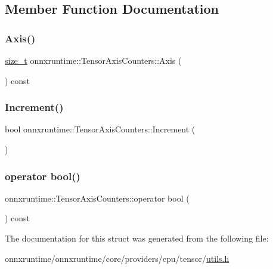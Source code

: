 \subsection{Member Function Documentation}
\mbox{\label{structonnxruntime_1_1TensorAxisCounters_a390b4fc504ddc306dc57ebf2da31dc43}} 
\subsubsection{\texorpdfstring{Axis()}{Axis()}}
{\footnotesize\ttfamily \mbox{\hyperlink{mlasi_8h_a503efbc1c6e50825320ad909366b78ab}{size\+\_\+t}} onnxruntime\+::\+Tensor\+Axis\+Counters\+::\+Axis (\begin{DoxyParamCaption}{ }\end{DoxyParamCaption}) const\hspace{0.3cm}{\ttfamily [inline]}}

\mbox{\label{structonnxruntime_1_1TensorAxisCounters_a415b830362fe2b8b3785aac919d5c3c9}} 
\subsubsection{\texorpdfstring{Increment()}{Increment()}}
{\footnotesize\ttfamily bool onnxruntime\+::\+Tensor\+Axis\+Counters\+::\+Increment (\begin{DoxyParamCaption}{ }\end{DoxyParamCaption})\hspace{0.3cm}{\ttfamily [inline]}}

\mbox{\label{structonnxruntime_1_1TensorAxisCounters_adcb26612a8a724933ec3103cf599c6f7}} 
\subsubsection{\texorpdfstring{operator bool()}{operator bool()}}
{\footnotesize\ttfamily onnxruntime\+::\+Tensor\+Axis\+Counters\+::operator bool (\begin{DoxyParamCaption}{ }\end{DoxyParamCaption}) const\hspace{0.3cm}{\ttfamily [inline]}}



The documentation for this struct was generated from the following file\+:\begin{DoxyCompactItemize}
\item 
onnxruntime/onnxruntime/core/providers/cpu/tensor/\mbox{\hyperlink{providers_2cpu_2tensor_2utils_8h}{utils.\+h}}\end{DoxyCompactItemize}

